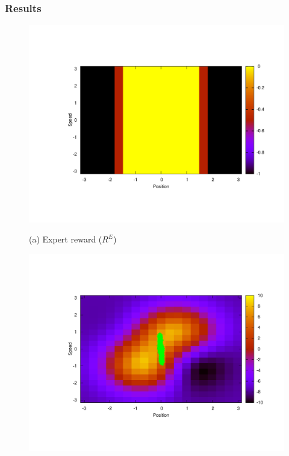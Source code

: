 \documentclass{article}
\begin{document}
\subsubsection{Results}
\begin{figure}[ht]
\begin{center}
\begin{minipage}[b]{.48\linewidth}
  \centering
  \centerline{\includegraphics[width=\columnwidth]{LAFEM_Exp3_true_R.pdf}}
  \centerline{(a) Expert reward ($R^E$)}%
\end{minipage}
\begin{minipage}[b]{.48\linewidth}
  \centering
  \centerline{\includegraphics[width=\columnwidth]{LAFEM_Exp3_lafem_R.pdf}}

\end{minipage}
\end{center}
\end{figure}
\end{document}

